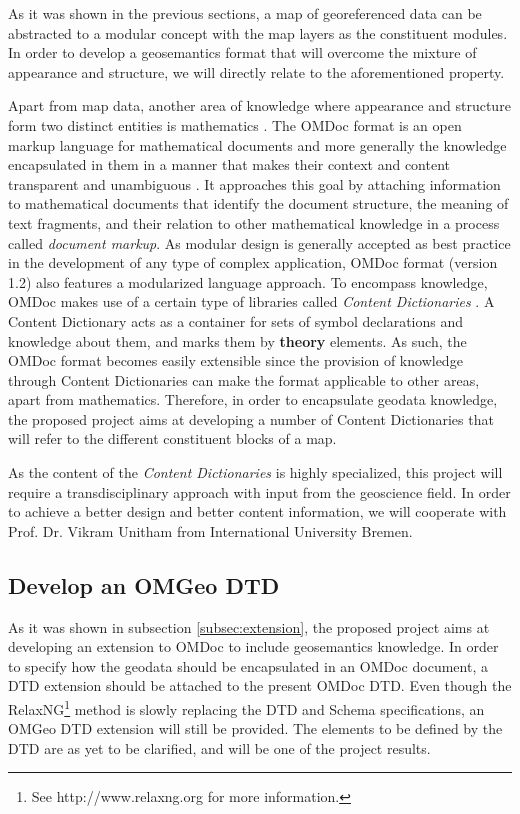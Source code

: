 \documentclass[a4paper,11pt,openany,notitlepage]{article}
\begin{document}
As it was shown in the previous sections, a map of georeferenced data can be abstracted to a modular concept with the map layers as the constituent modules. In order to develop a geosemantics format that will overcome the mixture of appearance and structure, we will directly relate to the aforementioned property.

Apart from map data, another area of knowledge where appearance and structure form two distinct entities is mathematics \cite{openmath2004}. The OMDoc format is an open markup language for mathematical documents and more generally the knowledge encapsulated in them in a manner that makes their context and content transparent and unambiguous \cite{kohlhase2004}. It approaches this goal by attaching information to mathematical documents that identify the document structure, the meaning of text fragments, and their relation to other mathematical knowledge in a process called \textit{document markup}. As modular design is generally accepted as best practice in the development of any type of complex application, OMDoc format (version 1.2) also features a modularized language approach. To encompass knowledge, OMDoc makes use of a certain type of libraries called \textit{Content Dictionaries} \cite{kohlhase2004}. A Content Dictionary acts as a container for sets of symbol declarations and knowledge about them, and marks them by \textbf{theory} elements. As such, the OMDoc format becomes easily extensible since the provision of knowledge through Content Dictionaries can make the format applicable to other areas, apart from mathematics. Therefore, in order to encapsulate geodata knowledge, the proposed project aims at developing a number of Content Dictionaries that will refer to the different constituent blocks of a map.

As the content of the \textit{Content Dictionaries} is highly specialized, this project will require a transdisciplinary approach with input from the geoscience field. In order to achieve a better design and better content information, we will cooperate with Prof. Dr. Vikram Unitham from International University Bremen.

\subsection{Develop an OMGeo DTD} \label{subsec:dtd}
\indent

As it was shown in subsection \ref{subsec:extension}, the proposed project aims at developing an extension to OMDoc to include geosemantics knowledge. In order to specify how the geodata should be encapsulated in an OMDoc document, a DTD extension should be attached to the present OMDoc DTD. Even though the RelaxNG\footnote{See http://www.relaxng.org for more information.} method is slowly replacing the DTD and Schema specifications, an OMGeo DTD extension will still be provided. The elements to be defined by the DTD are as yet to be clarified, and will be one of the project results.
\end{document}

